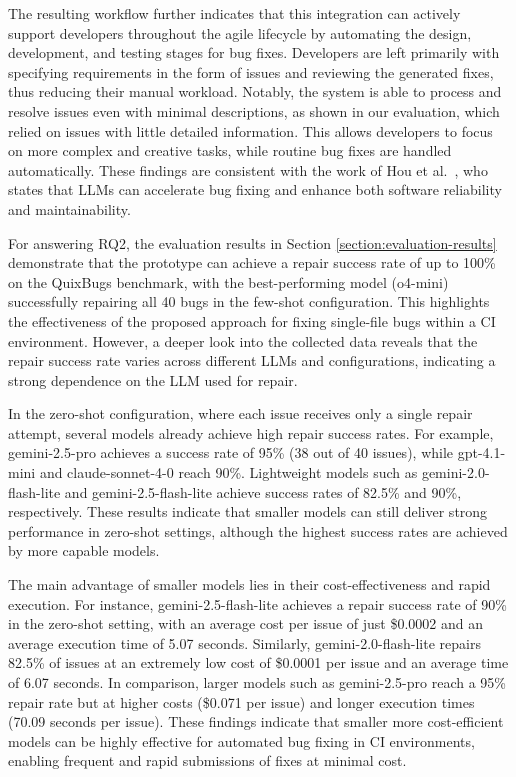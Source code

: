 The resulting workflow further indicates that this integration can actively support developers throughout the agile lifecycle by automating the design, development, and testing stages for bug fixes. Developers are left primarily with specifying requirements in the form of issues and reviewing the generated fixes, thus reducing their manual workload. Notably, the system is able to process and resolve issues even with minimal descriptions, as shown in our evaluation, which relied on issues with little detailed information. This allows developers to focus on more complex and creative tasks, while routine bug fixes are handled automatically. These findings are consistent with the work of Hou et al.~\cite{houLargeLanguageModels2024}, who states that \acp{LLM} can accelerate bug fixing and enhance both software reliability and maintainability.

For answering RQ2, the evaluation results in Section \ref{section:evaluation-results} demonstrate that the prototype can achieve a repair success rate of up to 100\% on the QuixBugs benchmark, with the best-performing model (o4-mini) successfully repairing all 40 bugs in the few-shot configuration. This highlights the effectiveness of the proposed approach for fixing single-file bugs within a CI environment. However, a deeper look into the collected data reveals that the repair success rate varies across different \acp{LLM} and configurations, indicating a strong dependence on the \ac{LLM} used for repair.

In the zero-shot configuration, where each issue receives only a single repair attempt, several models already achieve high repair success rates. For example, gemini-2.5-pro achieves a success rate of 95\% (38 out of 40 issues), while gpt-4.1-mini and claude-sonnet-4-0 reach 90\%. Lightweight models such as gemini-2.0-flash-lite and gemini-2.5-flash-lite achieve success rates of 82.5\% and 90\%, respectively. These results indicate that smaller models can still deliver strong performance in zero-shot settings, although the highest success rates are achieved by more capable models.

The main advantage of smaller models lies in their cost-effectiveness and rapid execution. For instance, gemini-2.5-flash-lite achieves a repair success rate of 90\% in the zero-shot setting, with an average cost per issue of just \$0.0002 and an average execution time of 5.07 seconds. Similarly, gemini-2.0-flash-lite repairs 82.5\% of issues at an extremely low cost of \$0.0001 per issue and an average time of 6.07 seconds. In comparison, larger models such as gemini-2.5-pro reach a 95\% repair rate but at higher costs (\$0.071 per issue) and longer execution times (70.09 seconds per issue). These findings indicate that smaller more cost-efficient models can be highly effective for automated bug fixing in CI environments, enabling frequent and rapid submissions of fixes at minimal cost.

